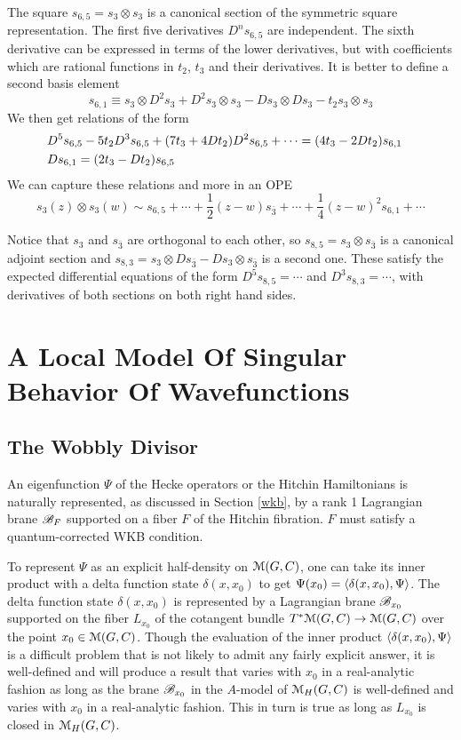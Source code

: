\documentclass[11pt,a4paper]{article}
\begin{document}
The square $s_{6,5} = s_3 \otimes s_3$ is a canonical section of the symmetric square representation. 
The first five derivatives $D^n s_{6,5}$ are independent. The sixth derivative can be expressed in terms of the 
lower derivatives, but with coefficients which are rational functions in $t_2$, $t_3$ and their derivatives. 
It is better to define a second basis element 
\begin{equation}
s_{6,1} \equiv s_3 \otimes D^2 s_3 + D^2 s_3 \otimes s_3 - D s_3 \otimes Ds_3- t_2 s_3 \otimes s_3
\end{equation} 
We then get relations of the form 
\begin{align}
&D^5 s_{6,5}- 5 t_2 D^3 s_{6,5}+ (7 t_3 + 4 D t_2)D^2 s_{6,5} + \cdots = (4 t_3 - 2 D t_2) s_{6,1} \cr
&D s_{6,1} = (2 t_3- D t_2) s_{6,5} 
\end{align} 
We can capture these relations and more in an OPE 
\begin{equation}
s_3(z) \otimes s_3(w) \sim s_{6,5} + \cdots + \frac12 (z-w) s_{\bar 3} +\cdots + \frac14 (z-w)^2 s_{6,1} + \cdots
\end{equation}

Notice that $s_3$ and $s_{\bar 3}$ are orthogonal to each other, so $s_{8,5} = s_3 \otimes s_{\bar 3}$ is a canonical adjoint section and
 $s_{8,3} = s_3 \otimes D s_{\bar 3}-D s_3 \otimes s_{\bar 3}$ is a second one. These satisfy the expected differential equations 
 of the form $D^5 s_{8,5} = \cdots$ and $D^3 s_{8,3}= \cdots$, with derivatives of both sections on both right hand sides. 
 
 
 \section{A Local Model Of Singular Behavior Of Wavefunctions }\label{localmodel}
 
 \subsection{The Wobbly Divisor}\label{wobbly}
 
An eigenfunction $\Psi$ of the Hecke operators or the Hitchin Hamiltonians is naturally represented, as discussed in Section \ref{wkb},  by a rank 1 Lagrangian
 brane ${\mathscr B}_F$ supported on a fiber $F$ of the Hitchin fibration.   $F$ must satisfy a quantum-corrected WKB condition.
 
 To represent $\Psi$ as an explicit half-density on ${\mathcal M}(G,C)$, one can take its inner product with a delta function state $\delta(x,x_0)$ 
 to get $\Psi(x_0)=\langle \delta(x,x_0),\Psi\rangle$.   The delta function state $\delta(x,x_0)$ is represented by a Lagrangian brane ${\mathscr B}_{x_0}$ supported on the fiber $L_{x_0}$
 of the cotangent
 bundle $T^*{\mathcal M}(G,C)\to {\mathcal M}(G,C)$ over the point  $x_0\in {\mathcal M}(G,C)$.   Though the evaluation of the inner product $\langle \delta(x,x_0),\Psi\rangle$ is a difficult problem that is not
 likely to admit any fairly explicit answer, it is well-defined and will produce a result that varies with $x_0$ in a real-analytic fashion as long as
 the brane ${\mathscr B}_{x_0}$ in the $A$-model of ${\mathcal M}_H(G,C)$ is well-defined and varies with $x_0$ in a real-analytic fashion.     This in turn is true as long as 
$L_{x_0}$
 is closed in ${\mathcal M}_H(G,C)$.   
 
\end{document}
